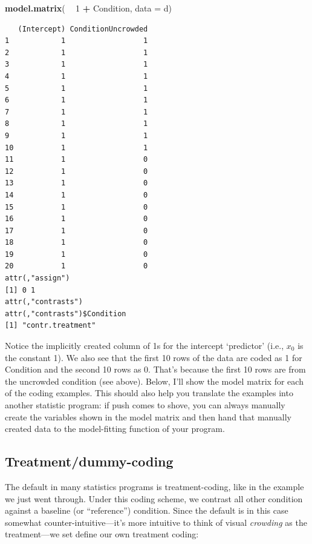\documentclass[
]{article}
\newenvironment{Shaded}{\begin{snugshade}}{\end{snugshade}}
\newcommand{\DataTypeTok}[1]{\textcolor[rgb]{0.13,0.29,0.53}{#1}}
\newcommand{\DecValTok}[1]{\textcolor[rgb]{0.00,0.00,0.81}{#1}}
\newcommand{\KeywordTok}[1]{\textcolor[rgb]{0.13,0.29,0.53}{\textbf{#1}}}
\newcommand{\NormalTok}[1]{#1}
\newcommand{\OperatorTok}[1]{\textcolor[rgb]{0.81,0.36,0.00}{\textbf{#1}}}
\newcommand{\StringTok}[1]{\textcolor[rgb]{0.31,0.60,0.02}{#1}}
\begin{document}
\footnotesize

\begin{Shaded}
\begin{Highlighting}[]
\KeywordTok{model.matrix}\NormalTok{( }\OperatorTok{~}\StringTok{ }\DecValTok{1} \OperatorTok{+}\StringTok{ }\NormalTok{Condition, }\DataTypeTok{data =}\NormalTok{ d)}
\end{Highlighting}
\end{Shaded}

\begin{verbatim}
   (Intercept) ConditionUncrowded
1            1                  1
2            1                  1
3            1                  1
4            1                  1
5            1                  1
6            1                  1
7            1                  1
8            1                  1
9            1                  1
10           1                  1
11           1                  0
12           1                  0
13           1                  0
14           1                  0
15           1                  0
16           1                  0
17           1                  0
18           1                  0
19           1                  0
20           1                  0
attr(,"assign")
[1] 0 1
attr(,"contrasts")
attr(,"contrasts")$Condition
[1] "contr.treatment"
\end{verbatim}

\normalsize

Notice the implicitly created column of 1s for the intercept `predictor'
(i.e., \(x_0\) is the constant 1). We also see that the first 10 rows of
the data are coded as 1 for Condition and the second 10 rows as 0.
That's because the first 10 rows are from the uncrowded condition (see
above). Below, I'll show the model matrix for each of the coding
examples. This should also help you translate the examples into another
statistic program: if push comes to shove, you can always manually
create the variables shown in the model matrix and then hand that
manually created data to the model-fitting function of your program.

\hypertarget{treatmentdummy-coding}{%
\subsection{Treatment/dummy-coding}\label{treatmentdummy-coding}}

The default in many statistics programs is treatment-coding, like in the
example we just went through. Under this coding scheme, we contrast all
other condition against a baseline (or ``reference'') condition. Since
the default is in this case somewhat counter-intuitive---it's more
intuitive to think of visual \emph{crowding} as the treatment---we set
define our own treatment coding:
\end{document}
